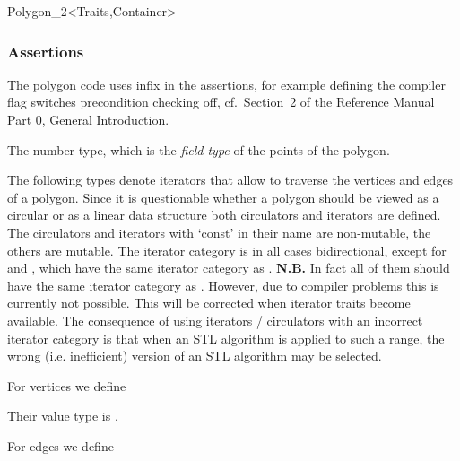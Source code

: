 \begin{ccClassTemplate}{Polygon_2<Traits,Container>}
\subsubsection*{Assertions}
The polygon code uses infix  in the assertions,
for example defining the compiler flag
 switches precondition
checking off, cf.~Section~2 of the Reference Manual Part 0, General 
Introduction.

\ccThreeToTwo
{}
\ccGlue
{}

{The number type, which is the {\em field type} of the points of the polygon.} 
\ccGlue
{}
\ccGlue
{}

The following types denote iterators that allow to traverse the vertices and
edges of a polygon. 
Since it is questionable whether a polygon should be viewed as a circular or 
as a linear data structure both circulators and iterators are defined.
The circulators and iterators with `const' in their name are non-mutable, the 
others are mutable.
The iterator category is in all cases bidirectional, except for
 and , which have the
same iterator category as .
{\bf N.B.} In fact all of them should have the same iterator category as
. However, due to compiler problems this is currently
not possible. This will be corrected when iterator traits become available.
The consequence of using iterators / circulators with an incorrect iterator
category is that when an STL algorithm is applied to such a range,
the wrong (i.e. inefficient) version of an STL algorithm may be selected. 

For vertices we define

\ccGlue
{}
\ccGlue
{}
\ccGlue
{}

Their value type is .

For edges we define

\ccGlue
{}


\end{ccClassTemplate}
